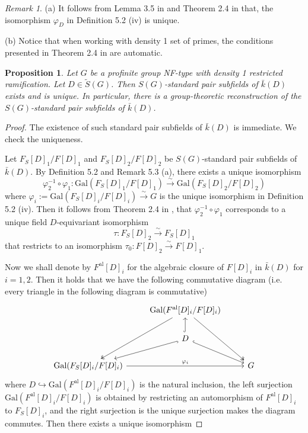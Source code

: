 \documentclass{article}
\theoremstyle{plain}
\newtheorem{prop}[thm]{Proposition}
\theoremstyle{definition}
\theoremstyle{remark}
\newtheorem{rem}[thm]{Remark}
\begin{document}
\begin{rem}
(a) It follows from Lemma 3.5 in \cite{Ho2} and Theorem 2.4 in \cite{Shi2} that, the isomorphism $\varphi_D$ in Definition 5.2 (iv) is unique. \par 
(b) Notice that when working with density 1 set of primes, the conditions presented in Theorem 2.4 in \cite{Shi2} are automatic. \par 
\end{rem}
\begin{prop}
Let $G$ be a profinite group NF-type with density 1 restricted ramification. Let $D \in \widetilde{S}(G)$. Then $S(G)$-standard pair subfields of $\bar k(D)$ exists and is unique. In particular, there is a group-theoretic reconstruction of the $S(G)$-standard pair subfields of $\bar k(D)$.
\end{prop}
\begin{proof}
The existence of such standard pair subfields of $\bar k(D)$ is immediate. We check the uniqueness. \par 
Let $F_S[D]_1/F[D]_1$ and $F_S[D]_2/F[D]_2$ be $S(G)$-standard pair subfields of $\bar k(D)$. By Definition 5.2 and Remark 5.3 (a), there exists a unique isomorphism
$$
\varphi_2^{-1} \circ \varphi_1: \text{Gal}(F_S[D]_1/F[D]_1) \xrightarrow{\sim} \text{Gal}(F_S[D]_2/F[D]_2)
$$
where $\varphi_i := \text{Gal}(F_S[D]_i/F[D]_i) \xrightarrow{\sim} G$ is the unique isomorphism in Definition 5.2 (iv). Then it follows from Theorem 2.4 in \cite{Shi2}, that $\varphi_2^{-1}\circ \varphi_1$ corresponds to a unique field $D$-equivariant isomorphism
$$
\tau: F_S[D]_2 \xrightarrow{\sim} F_S[D]_1
$$
that restricts to an isomorphism $\tau_0: F[D]_2 \xrightarrow{\sim} F[D]_1$. \par
Now we shall denote by $F^{\text{al}}[D]_i$ for the algebraic closure of $F[D]_i$ in $\bar k(D)$ for $i = 1,2$. Then it holds that we have the following commutative diagram (i.e. every triangle in the following diagram is commutative)
$$
\begin{tikzcd}
	& {\text{Gal}(F^{\text{al}}[D]_i/F[D]_i)} \\
	& D \\
	{\text{Gal}(F_S[D]_i/F[D]_i)} && G
	\arrow[two heads, from=1-2, to=3-1]
	\arrow[two heads, from=1-2, to=3-3]
	\arrow[hook, from=2-2, to=1-2]
	\arrow[hook, from=2-2, to=3-1]
	\arrow[hook, from=2-2, to=3-3]
	\arrow["{\varphi_i}", from=3-1, to=3-3]
\end{tikzcd}
$$
where $D \hookrightarrow \text{Gal}(F^{\text{al}}[D]_i/F[D]_i)$ is the natural inclusion, the left surjection $\text{Gal}(F^{\text{al}}[D]_i/F[D]_i)$ is obtained by restricting an automorphism of $F^{\text{al}}[D]_i$ to $F_S[D]_i$, and the right surjection is the unique surjection makes the diagram commutes. Then there exists a unique isomorphism

\end{proof}
\end{document}
